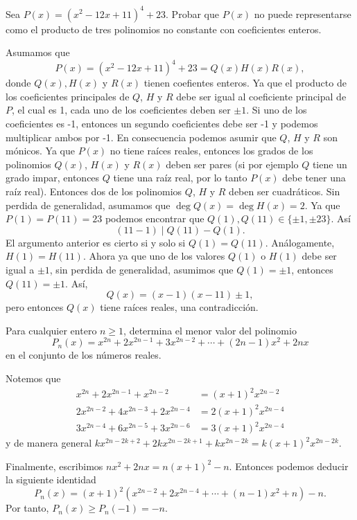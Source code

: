 \begin{example}
    Sea $P(x) = (x^2 - 12x + 11)^4 + 23$.
    Probar que $P(x)$ no puede representarse como el producto de tres polinomios no constante con coeficientes enteros.
\end{example}
\begin{solution}
    Asumamos que
    \[
        P(x) = (x^2 - 12x + 11)^4 + 23 = Q(x) H(x) R(x),
    \]
    donde $Q(x), H(x)$ y $R(x)$ tienen coefientes enteros.
    Ya que el producto de los coeficientes principales de $Q$, $H$ y $R$ debe ser igual al coeficiente principal de $P$, el cual es 1, cada uno de los coeficientes deben ser $\pm 1$.
    Si uno de los coeficientes es -1, entonces un segundo coeficientes debe ser -1 y podemos multiplicar ambos por -1.
    En consecuencia podemos asumir que $Q$, $H$ y $R$ son mónicos.
    Ya que $P(x)$ no tiene raíces reales, entonces los grados de los polinomios $Q(x)$, $H(x)$ y $R(x)$ deben ser pares (si por ejemplo $Q$ tiene un grado impar, entonces $Q$ tiene una raíz real, por lo tanto $P(x)$ debe tener una raíz real).
    Entonces dos de los polinomios $Q$, $H$ y $R$ deben ser cuadráticos.
    Sin perdida de generalidad, asumamos que $\deg{Q(x)} = \deg{H(x)} = 2$.
    Ya que $P(1) = P(11) = 23$ podemos encontrar que $Q(1), Q(11) \in \{\pm 1, \pm 23\}$.
    Así
    \[
        (11 - 1) \mid Q(11) - Q(1).
    \]
    El argumento anterior es cierto si y solo si $Q(1) = Q(11)$.
    Análogamente, $H(1) = H(11)$.
    Ahora ya que uno de los valores $Q(1)$ o $H(1)$ debe ser igual a $\pm 1$, sin perdida de generalidad, asumimos que $Q(1) = \pm 1$, entonces $Q(11) = \pm 1$.
    Así,
    \[
        Q(x) = (x - 1)(x - 11) \pm 1,
    \]
    pero entonces $Q(x)$ tiene raíces reales, una contradicción.
\end{solution}

\begin{example}
    Para cualquier entero $n \geq 1$, determina el menor valor del polinomio
    \[
        P_n(x) = x^{2n} + 2 x^{2n - 1} + 3x^{2n - 2} + \cdots + (2n - 1)x^2 + 2nx
    \]
    en el conjunto de los números reales.
\end{example}
\begin{solution}
    Notemos que
    \begin{align*}
         x^{2n}     + 2x^{2n - 1} +  x^{2n - 2} &=  (x + 1)^2 x^{2n - 2}\\
        2x^{2n - 2} + 4x^{2n - 3} + 2x^{2n - 4} &= 2(x + 1)^2 x^{2n - 4}\\
        3x^{2n - 4} + 6x^{2n - 5} + 3x^{2n - 6} &= 3(x + 1)^2 x^{2n - 4}
    \end{align*}
    y de manera general $k x^{2n - 2k + 2} + 2k x^{2n - 2k + 1} + k x^{2n - 2k} = k(x + 1)^2 x^{2n - 2k}.$

    Finalmente, escribimos $n x^2 + 2nx = n(x + 1)^2 - n$.
    Entonces podemos deducir la siguiente identidad
    \[
        P_n (x) = (x + 1)^2 \left(x^{2n - 2} + 2x^{2n - 4} + \cdots + (n - 1)x^2 + n\right) - n.
    \]
    Por tanto, $P_n(x) \geq P_n(-1) = -n$.
\end{solution}


